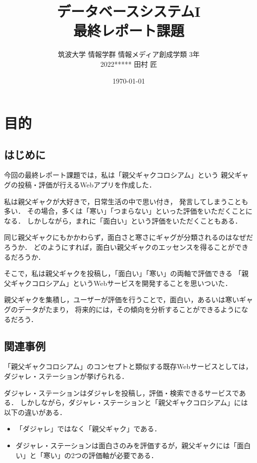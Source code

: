 \documentclass[a4paper,dvipdfmx,11pt]{jsreport}
\begin{document}
\title{データベースシステムI\\最終レポート課題}
\author{筑波大学 情報学群 情報メディア創成学類 3年\\ 2022***** 田村 匠}
\date{\today}
\maketitle

\tableofcontents

\chapter{目的}
\section{はじめに}
今回の最終レポート課題では，私は「親父ギャクコロシアム」という
親父ギャグの投稿・評価が行えるWebアプリを作成した．

私は親父ギャクが大好きで，日常生活の中で思い付き，
発言してしまうことも多い．
その場合，多くは「寒い」「つまらない」といった評価をいただくことになる．
しかしながら，まれに「面白い」という評価をいただくこともある．

同じ親父ギャクにもかかわらず，面白さと寒さにギャグが分類されるのはなぜだろうか．
どのようにすれば，面白い親父ギャクのエッセンスを得ることができるだろうか．

そこで，私は親父ギャクを投稿し，「面白い」「寒い」の両軸で評価できる
「親父ギャクコロシアム」というWebサービスを開発することを思いついた．

親父ギャクを集積し，ユーザーが評価を行うことで，面白い，あるいは寒いギャグのデータがたまり，
将来的には，その傾向を分析することができるようになるだろう．

\section{関連事例}
「親父ギャクコロシアム」のコンセプトと類似する既存Webサービスとしては，
ダジャレ・ステーション\cite{dajare-sta}が挙げられる．

ダジャレ・ステーションはダジャレを投稿し，評価・検索できるサービスである．
しかしながら，ダジャレ・ステーションと「親父ギャクコロシアム」には以下の違いがある．

\begin{itemize}
  \item 「ダジャレ」ではなく「親父ギャク」である．
  \item ダジャレ・ステーションは面白さのみを評価するが，親父ギャクには「面白い」と「寒い」の2つの評価軸が必要である．
\end{itemize}
\end{document}
